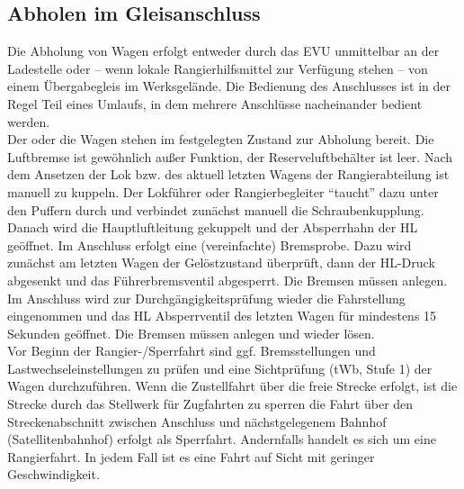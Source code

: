 \subsection{Abholen im Gleisanschluss}
Die Abholung von Wagen erfolgt entweder durch das EVU unmittelbar an der Ladestelle oder -- wenn lokale Rangierhilfsmittel zur Verfügung stehen -- von einem Übergabegleis im Werksgelände. Die Bedienung des Anschlusses ist in der Regel Teil eines Umlaufs, in dem mehrere Anschlüsse nacheinander bedient werden. \\
Der oder die Wagen stehen im festgelegten Zustand zur Abholung bereit. Die Luftbremse ist gewöhnlich außer Funktion, der Reserveluftbehälter ist leer. Nach dem Ansetzen der Lok bzw. des aktuell letzten Wagens der Rangierabteilung ist manuell zu kuppeln. Der Lokführer oder Rangierbegleiter "`taucht"' dazu unter den Puffern durch und verbindet zunächst manuell die Schraubenkupplung. Danach wird die Hauptluftleitung gekuppelt und der Absperrhahn der HL geöffnet. Im Anschluss erfolgt eine (vereinfachte) Bremsprobe. Dazu wird zunächst am letzten Wagen der Gelöstzustand überprüft, dann der HL-Druck abgesenkt und das Führerbremsventil abgesperrt. Die Bremsen müssen anlegen. Im Anschluss wird zur Durchgängigkeitsprüfung wieder die Fahrstellung eingenommen und das HL Absperrventil des letzten Wagen für mindestens 15 Sekunden geöffnet. Die Bremsen müssen anlegen und wieder lösen.\\
Vor Beginn der Rangier-/Sperrfahrt sind ggf. Bremsstellungen und Lastwechseleinstellungen zu prüfen und eine Sichtprüfung (tWb, Stufe 1) der Wagen durchzuführen. Wenn die Zustellfahrt über die freie Strecke erfolgt, ist die Strecke durch das Stellwerk für Zugfahrten zu sperren die Fahrt über den Streckenabschnitt zwischen Anschluss und nächstgelegenem Bahnhof (Satellitenbahnhof) erfolgt als Sperrfahrt. Andernfalls handelt es sich um eine Rangierfahrt. In jedem Fall ist es eine Fahrt auf Sicht mit geringer Geschwindigkeit.

